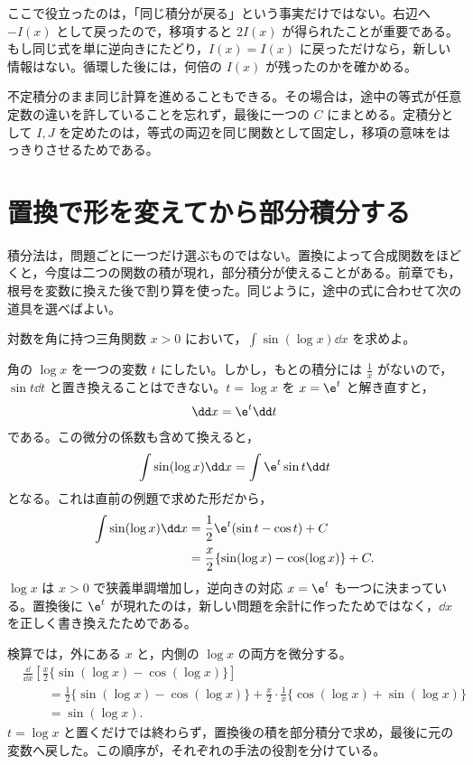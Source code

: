 ここで役立ったのは，「同じ積分が戻る」という事実だけではない。右辺へ $-I(x)$ として戻ったので，移項すると $2I(x)$ が得られたことが重要である。もし同じ式を単に逆向きにたどり，$I(x)=I(x)$ に戻っただけなら，新しい情報はない。循環した後には，何倍の $I(x)$ が残ったのかを確かめる。

不定積分のまま同じ計算を進めることもできる。その場合は，途中の等式が任意定数の違いを許していることを忘れず，最後に一つの $C$ にまとめる。定積分として $I,J$ を定めたのは，等式の両辺を同じ関数として固定し，移項の意味をはっきりさせるためである。

\section{置換で形を変えてから部分積分する}\label{節:置換と部分積分}

積分法は，問題ごとに一つだけ選ぶものではない。置換によって合成関数をほどくと，今度は二つの関数の積が現れ，部分積分が使えることがある。前章でも，根号を変数に換えた後で割り算を使った。同じように，途中の式に合わせて次の道具を選べばよい。

\begin{example}{対数を角に持つ三角関数}
$x>0$ において，$\int\sin(\log x)\dd x$ を求めよ。
\end{example}

角の $\log x$ を一つの変数 $t$ にしたい。しかし，もとの積分には $\frac1x$ がないので，$\sin t\dd t$ と置き換えることはできない。$t=\log x$ を $x=\e^t$ と解き直すと，
\[
 \dd x=\e^t\dd t
\]
である。この微分の係数も含めて換えると，
\[
 \int\sin(\log x)\dd x
 =\int\e^t\sin t\dd t
\]
となる。これは直前の例題で求めた形だから，
\[
\begin{aligned}
 \int\sin(\log x)\dd x
 &=\frac12\e^t(\sin t-\cos t)+C\\
 &=\frac x2\{\sin(\log x)-\cos(\log x)\}+C.
\end{aligned}
\]
$\log x$ は $x>0$ で狭義単調増加し，逆向きの対応 $x=\e^t$ も一つに決まっている。置換後に $\e^t$ が現れたのは，新しい問題を余計に作ったためではなく，$\dd x$ を正しく書き換えたためである。

検算では，外にある $x$ と，内側の $\log x$ の両方を微分する。
\[
\begin{aligned}
 &\frac{\dd}{\dd x}
 \left[\frac x2\{\sin(\log x)-\cos(\log x)\}\right]\\
 &\qquad=\frac12\{\sin(\log x)-\cos(\log x)\}
   +\frac x2\cdot\frac1x
     \{\cos(\log x)+\sin(\log x)\}\\
 &\qquad=\sin(\log x).
\end{aligned}
\]
$t=\log x$ と置くだけでは終わらず，置換後の積を部分積分で求め，最後に元の変数へ戻した。この順序が，それぞれの手法の役割を分けている。


